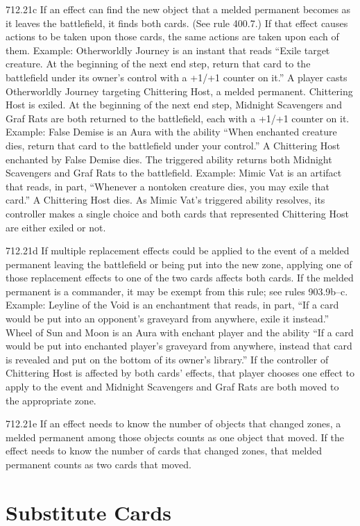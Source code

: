 712.21c If an effect can find the new object that a melded permanent becomes as it leaves the battlefield, it finds both cards. (See rule 400.7.) If that effect causes actions to be taken upon those cards, the same actions are taken upon each of them.
Example: Otherworldly Journey is an instant that reads “Exile target creature. At the beginning of the next end step, return that card to the battlefield under its owner’s control with a +1/+1 counter on it.” A player casts Otherworldly Journey targeting Chittering Host, a melded permanent. Chittering Host is exiled. At the beginning of the next end step, Midnight Scavengers and Graf Rats are both returned to the battlefield, each with a +1/+1 counter on it.
Example: False Demise is an Aura with the ability “When enchanted creature dies, return that card to the battlefield under your control.” A Chittering Host enchanted by False Demise dies. The triggered ability returns both Midnight Scavengers and Graf Rats to the battlefield.
Example: Mimic Vat is an artifact that reads, in part, “Whenever a nontoken creature dies, you may exile that card.” A Chittering Host dies. As Mimic Vat’s triggered ability resolves, its controller makes a single choice and both cards that represented Chittering Host are either exiled or not.

712.21d If multiple replacement effects could be applied to the event of a melded permanent leaving the battlefield or being put into the new zone, applying one of those replacement effects to one of the two cards affects both cards. If the melded permanent is a commander, it may be exempt from this rule; see rules 903.9b–c.
Example: Leyline of the Void is an enchantment that reads, in part, “If a card would be put into an opponent’s graveyard from anywhere, exile it instead.” Wheel of Sun and Moon is an Aura with enchant player and the ability “If a card would be put into enchanted player’s graveyard from anywhere, instead that card is revealed and put on the bottom of its owner’s library.” If the controller of Chittering Host is affected by both cards’ effects, that player chooses one effect to apply to the event and Midnight Scavengers and Graf Rats are both moved to the appropriate zone.

712.21e If an effect needs to know the number of objects that changed zones, a melded permanent among those objects counts as one object that moved. If the effect needs to know the number of cards that changed zones, that melded permanent counts as two cards that moved.

\section{Substitute Cards}
